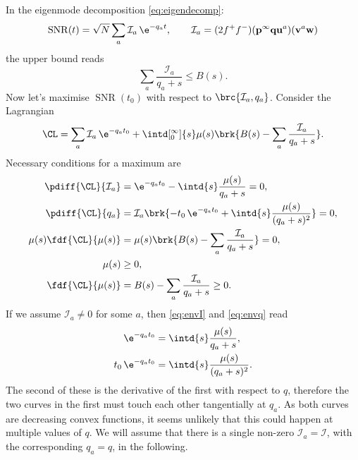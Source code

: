 \documentclass[12pt]{article}
\newcommand{\eq}{\mathbf{p}^\infty}
\newcommand{\w}{\mathbf{w}}
\newcommand{\uv}{\mathbf{u}}
\newcommand{\vv}{\mathbf{v}}
\newcommand{\enc}{\mathbf{q}}
\DeclareMathOperator{\snr}{SNR}
\newcommand{\CI}{\mathcal{I}}
\begin{document}
In the eigenmode decomposition \eqref{eq:eigendecomp}:
%
\begin{equation}\label{eq:eigenmode}
  \snr(t) = \sqrt{N}\sum_a \CI_a\, \e^{-q_a t},
  \qquad
  \CI_a = (2f^+f^-) (\eq \enc \uv^a) (\vv^a \w)
\end{equation}
%
the upper bound reads
%
\begin{equation}\label{eq:lboundeig}
  \sum_a \frac{\CI_a}{q_a+s} \leq B(s).
\end{equation}
%
Now let's maximise $\snr(t_0)$ with respect to $\brc{\CI_a,q_a}$.
Consider the Lagrangian
%
\begin{equation}\label{eq:envlagrange}
  \CL = \sum_a \CI_a\, \e^{-q_a t_0} +\intd[_0^\infty]{s} \mu(s)\brk{B(s)-\sum_a\frac{\CI_a}{q_a+s}}.
\end{equation}
%
Necessary conditions for a maximum are
%
\begin{alignat}{3}
  \pdiff{\CL}{\CI_a} &= \e^{-q_a t_0} - \intd{s} \frac{\mu(s)}{q_a+s} = 0, \label{eq:envI}\\
  \pdiff{\CL}{q_a} &= \CI_a\brk{-t_0\,\e^{-q_a t_0} + \intd{s} \frac{\mu(s)}{(q_a+s)^2}} = 0, \label{eq:envq}\\
  \mu(s)\fdf{\CL}{\mu(s)} &= \mu(s)\brk{B(s)-\sum_a\frac{\CI_a}{q_a+s}} = 0, \label{eq:envKT}\\
  \mu(s) &\geq 0, \label{eq:envKTm}\\
  \fdf{\CL}{\mu(s)} &= B(s)-\sum_a\frac{\CI_a}{q_a+s} \geq 0 \label{eq:envKTbnd}.
\end{alignat}
%
If we assume $\CI_a \neq0$ for some $a$, then \eqref{eq:envI} and \eqref{eq:envq} read
%
\begin{equation}\label{eq:envnumexp}
\begin{aligned}
  \e^{-q_a t_0} &= \intd{s} \frac{\mu(s)}{q_a+s}, \\
  t_0\,\e^{-q_a t_0} &= \intd{s} \frac{\mu(s)}{(q_a+s)^2}.
\end{aligned}
\end{equation}
%
The second of these is the derivative of the first with respect to $q$, therefore the two curves in the first must touch each other tangentially at $q_a$.
As both curves are decreasing convex functions, it seems unlikely that this could happen at multiple values of $q$.
We will assume that there is a single non-zero $\CI_a=\CI$, with the corresponding $q_a=q$, in the following.
\end{document}
